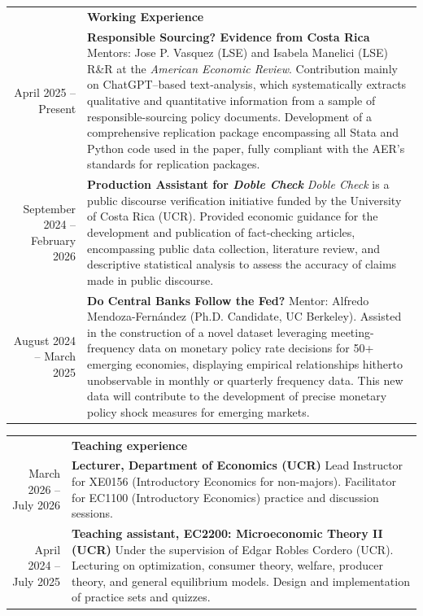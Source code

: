 \documentclass[letterpaper, 11pt]{article}
\newcommand{\headingfont}{\bfseries\Large\color{ChadDarkBlue}}
\newenvironment{SectionTable}[1]{
	\renewcommand*{\arraystretch}{1.7}
	\setlength{\tabcolsep}{10pt}
	\begin{longtable}{Rp{5.2in}} & #1 \\}
{\end{longtable}\vspace{-1cm}}
\begin{document}
\begin{SectionTable}{\headingfont Working Experience}
April 2025 -- Present &
\textbf{Responsible Sourcing?
 Evidence from Costa Rica} \newline
Mentors: Jose P. Vasquez (LSE) and Isabela Manelici (LSE)\newline
R\&R at the \textit{American Economic Review}. Contribution mainly on ChatGPT–based text‐analysis, which systematically extracts qualitative and quantitative information from a sample of responsible-sourcing policy documents. Development of a comprehensive replication package encompassing all Stata and Python code used in the paper, fully compliant with the AER’s standards for replication packages. \\

September 2024 -- February 2026 & \textbf{Production Assistant for \textit{Doble Check}} \newline 
\textit{Doble Check} is a public discourse verification initiative funded by the University of Costa Rica (UCR). Provided economic guidance for the development and publication of fact-checking articles, encompassing public data collection, literature review, and descriptive statistical analysis to assess the accuracy of claims made in public discourse.
\\

August 2024 -- March 2025 &
\textbf{Do Central Banks Follow the Fed?} \newline
Mentor: Alfredo Mendoza-Fern\'andez (Ph.D. Candidate, UC Berkeley). \newline
Assisted in the construction of a novel dataset leveraging meeting-frequency data on monetary policy rate decisions for 50+ emerging economies, displaying empirical relationships hitherto unobservable in monthly or quarterly frequency data. This new data will contribute to the development of precise monetary policy shock measures for emerging markets. \\

\end{SectionTable}


\begin{SectionTable}{\headingfont Teaching experience}

March 2026 -- July 2026 &
\textbf{Lecturer, Department of Economics (UCR)} \newline
    Lead Instructor for XE0156 (Introductory Economics for non-majors). Facilitator for EC1100 (Introductory Economics) practice and discussion sessions. \\

April 2024 -- July 2025 & 
\textbf{Teaching assistant, EC2200: Microeconomic Theory II (UCR)} \newline
    Under the supervision of Edgar Robles Cordero (UCR). Lecturing on optimization, consumer theory, welfare, producer theory, and general equilibrium models. Design and implementation of practice sets and quizzes.
\end{SectionTable}
\end{document}
